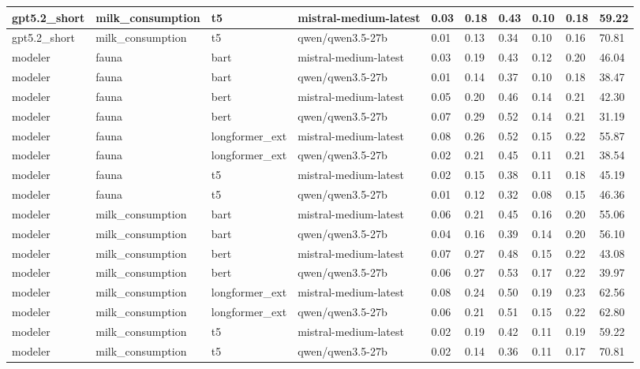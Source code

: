 \begin{tabular}{|l|l|l|l|l|l|l|l|l|l|}
 \hline
 gpt5.2\_short & milk\_consumption & t5 & mistral-medium-latest & 0.03 & 0.18 & 0.43 & 0.10 & 0.18 & 59.22 \\
 \hline
 gpt5.2\_short & milk\_consumption & t5 & qwen/qwen3.5-27b & 0.01 & 0.13 & 0.34 & 0.10 & 0.16 & 70.81 \\
 \hline
 modeler & fauna & bart & mistral-medium-latest & 0.03 & 0.19 & 0.43 & 0.12 & 0.20 & 46.04 \\
 \hline
 modeler & fauna & bart & qwen/qwen3.5-27b & 0.01 & 0.14 & 0.37 & 0.10 & 0.18 & 38.47 \\
 \hline
 modeler & fauna & bert & mistral-medium-latest & 0.05 & 0.20 & 0.46 & 0.14 & 0.21 & 42.30 \\
 \hline
 modeler & fauna & bert & qwen/qwen3.5-27b & 0.07 & 0.29 & 0.52 & 0.14 & 0.21 & 31.19 \\
 \hline
 modeler & fauna & longformer\_ext & mistral-medium-latest & 0.08 & 0.26 & 0.52 & 0.15 & 0.22 & 55.87 \\
 \hline
 modeler & fauna & longformer\_ext & qwen/qwen3.5-27b & 0.02 & 0.21 & 0.45 & 0.11 & 0.21 & 38.54 \\
 \hline
 modeler & fauna & t5 & mistral-medium-latest & 0.02 & 0.15 & 0.38 & 0.11 & 0.18 & 45.19 \\
 \hline
 modeler & fauna & t5 & qwen/qwen3.5-27b & 0.01 & 0.12 & 0.32 & 0.08 & 0.15 & 46.36 \\
 \hline
 modeler & milk\_consumption & bart & mistral-medium-latest & 0.06 & 0.21 & 0.45 & 0.16 & 0.20 & 55.06 \\
 \hline
 modeler & milk\_consumption & bart & qwen/qwen3.5-27b & 0.04 & 0.16 & 0.39 & 0.14 & 0.20 & 56.10 \\
 \hline
 modeler & milk\_consumption & bert & mistral-medium-latest & 0.07 & 0.27 & 0.48 & 0.15 & 0.22 & 43.08 \\
 \hline
 modeler & milk\_consumption & bert & qwen/qwen3.5-27b & 0.06 & 0.27 & 0.53 & 0.17 & 0.22 & 39.97 \\
 \hline
 modeler & milk\_consumption & longformer\_ext & mistral-medium-latest & 0.08 & 0.24 & 0.50 & 0.19 & 0.23 & 62.56 \\
 \hline
 modeler & milk\_consumption & longformer\_ext & qwen/qwen3.5-27b & 0.06 & 0.21 & 0.51 & 0.15 & 0.22 & 62.80 \\
 \hline
 modeler & milk\_consumption & t5 & mistral-medium-latest & 0.02 & 0.19 & 0.42 & 0.11 & 0.19 & 59.22 \\
 \hline
 modeler & milk\_consumption & t5 & qwen/qwen3.5-27b & 0.02 & 0.14 & 0.36 & 0.11 & 0.17 & 70.81 \\
\hline
\end{tabular}
